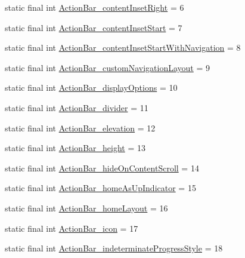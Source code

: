 \begin{DoxyCompactItemize}
static final int \mbox{\hyperlink{classcom_1_1synnapps_1_1carouselview_1_1_r_1_1styleable_aa944f3eaff975d07ac33c2d52ffffbfb}{Action\+Bar\+\_\+content\+Inset\+Right}} = 6
\item 
static final int \mbox{\hyperlink{classcom_1_1synnapps_1_1carouselview_1_1_r_1_1styleable_a897920e7c9185db3f39a4e20e48df5da}{Action\+Bar\+\_\+content\+Inset\+Start}} = 7
\item 
static final int \mbox{\hyperlink{classcom_1_1synnapps_1_1carouselview_1_1_r_1_1styleable_a9577c243c1feeb3b6937cdd54de81fc4}{Action\+Bar\+\_\+content\+Inset\+Start\+With\+Navigation}} = 8
\item 
static final int \mbox{\hyperlink{classcom_1_1synnapps_1_1carouselview_1_1_r_1_1styleable_a1a3e0a17c637c3d1394285470cd9c4f6}{Action\+Bar\+\_\+custom\+Navigation\+Layout}} = 9
\item 
static final int \mbox{\hyperlink{classcom_1_1synnapps_1_1carouselview_1_1_r_1_1styleable_a98a26db8d1eb25f21dfd744ded20f446}{Action\+Bar\+\_\+display\+Options}} = 10
\item 
static final int \mbox{\hyperlink{classcom_1_1synnapps_1_1carouselview_1_1_r_1_1styleable_a70fbbf3647cfc098d4fec4505465a569}{Action\+Bar\+\_\+divider}} = 11
\item 
static final int \mbox{\hyperlink{classcom_1_1synnapps_1_1carouselview_1_1_r_1_1styleable_a22ce3b969e2452328d3d2029efff33bd}{Action\+Bar\+\_\+elevation}} = 12
\item 
static final int \mbox{\hyperlink{classcom_1_1synnapps_1_1carouselview_1_1_r_1_1styleable_a9336d5e4a2c7f959e4ba444387f8ef00}{Action\+Bar\+\_\+height}} = 13
\item 
static final int \mbox{\hyperlink{classcom_1_1synnapps_1_1carouselview_1_1_r_1_1styleable_a2dde35fc2e68ed040fac88ab310d362d}{Action\+Bar\+\_\+hide\+On\+Content\+Scroll}} = 14
\item 
static final int \mbox{\hyperlink{classcom_1_1synnapps_1_1carouselview_1_1_r_1_1styleable_aec6baf543ce9217290237d4bd2897282}{Action\+Bar\+\_\+home\+As\+Up\+Indicator}} = 15
\item 
static final int \mbox{\hyperlink{classcom_1_1synnapps_1_1carouselview_1_1_r_1_1styleable_a2cf3d4b0d3b750bcf1bd617e98a0c73f}{Action\+Bar\+\_\+home\+Layout}} = 16
\item 
static final int \mbox{\hyperlink{classcom_1_1synnapps_1_1carouselview_1_1_r_1_1styleable_a1fa6f215b5a277779fe1131aed49b3e3}{Action\+Bar\+\_\+icon}} = 17
\item 
static final int \mbox{\hyperlink{classcom_1_1synnapps_1_1carouselview_1_1_r_1_1styleable_a45a6efe9fe08210cc032c7820fab8f08}{Action\+Bar\+\_\+indeterminate\+Progress\+Style}} = 18

\end{DoxyCompactItemize}
